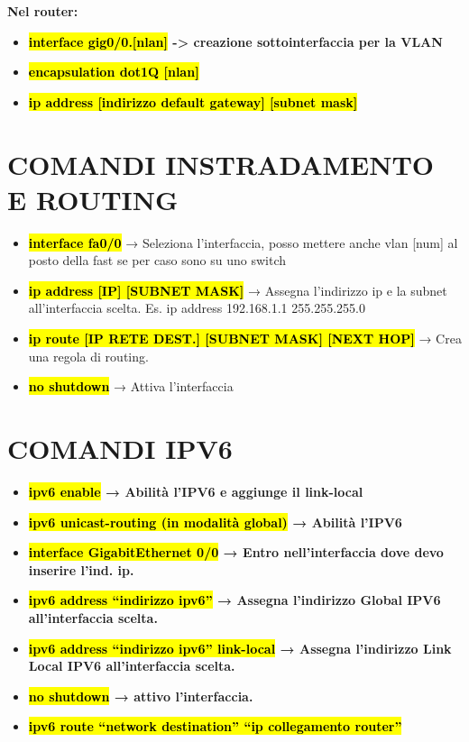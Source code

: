 \textbf{Nel router:}

\begin{itemize}
\item
  \textbf{\hl{interface gig0/0.{[}nlan{]}} -\textgreater{} creazione
  sottointerfaccia per la VLAN}
\item
  \textbf{\hl{encapsulation dot1Q {[}nlan{]}}}
\item
  \textbf{\hl{ip address {[}indirizzo default gateway{]} {[}subnet
  mask{]}}}
\end{itemize}

\section{COMANDI INSTRADAMENTO E
ROUTING}\label{comandi-instradamento-e-routing}

\begin{itemize}
\item
  \textbf{\hl{interface fa0/0}} → Seleziona l'interfaccia, posso mettere
  anche vlan {[}num{]} al posto della fast se per caso sono su uno
  switch
\item
  \textbf{\hl{ip address {[}IP{]} {[}SUBNET MASK{]}}} → Assegna
  l'indirizzo ip e la subnet all'interfaccia scelta. Es. ip address
  192.168.1.1 255.255.255.0
\item
  \textbf{\hl{ip route {[}IP RETE DEST.{]} {[}SUBNET MASK{]} {[}NEXT
  HOP{]}}} → Crea una regola di routing.
\item
  \textbf{\hl{no shutdown}} → Attiva l'interfaccia
\end{itemize}

\section{COMANDI IPV6}\label{comandi-ipv6}

\begin{itemize}
\item
  \textbf{\hl{ipv6 enable} → Abilità l'IPV6 e aggiunge il link-local}
\item
  \textbf{\hl{ipv6 unicast-routing (in modalità global)} → Abilità
  l'IPV6}
\item
  \textbf{\hl{interface GigabitEthernet 0/0} → Entro nell'interfaccia
  dove devo inserire l'ind. ip.}
\item
  \textbf{\hl{ipv6 address ``indirizzo ipv6''} → Assegna l'indirizzo
  Global IPV6 all'interfaccia scelta.}
\item
  \textbf{\hl{ipv6 address ``indirizzo ipv6'' link-local} → Assegna
  l'indirizzo Link Local IPV6 all'interfaccia scelta.}
\item
  \textbf{\hl{no shutdown} → attivo l'interfaccia.}
\item
  \textbf{\hl{ipv6 route ``network destination'' ``ip collegamento
  router''}}
\end{itemize}

